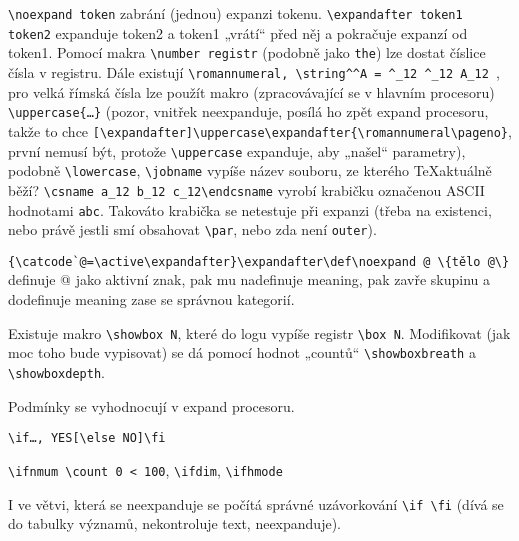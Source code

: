 \documentclass[12pt]{article}					%
\begin{document}
\begin{definice}
        \verb|\noexpand token| zabrání (jednou) expanzi tokenu. \verb|\expandafter token1 token2| expanduje token2 a token1 „vrátí“ před něj a pokračuje expanzí od token1. Pomocí makra \verb|\number registr| (podobně jako \verb|the|) lze dostat číslice čísla v registru. Dále existují \verb|\romannumeral, \string^^A = ^_12 ^_12 A_12 |, pro velká římská čísla lze použít makro (zpracovávající se v hlavním procesoru) \verb|\uppercase{…}| (pozor, vnitřek neexpanduje, posílá ho zpět expand procesoru, takže to chce \verb|[\expandafter]\uppercase\expandafter{\romannumeral\pageno}|, první nemusí být, protože \verb|\uppercase| expanduje, aby „našel“ parametry), podobně \verb|\lowercase|, \verb|\jobname| vypíše název souboru, ze kterého \TeX aktuálně běží? \verb|\csname a_12 b_12 c_12\endcsname| vyrobí krabičku označenou ASCII hodnotami \verb|abc|. Takováto krabička se netestuje při expanzi (třeba na existenci, nebo právě jestli smí obsahovat \verb|\par|, nebo zda není \verb|outer|).
    \end{definice}

    \begin{priklad}
        \verb|{\catcode`@=\active\expandafter}\expandafter\def\noexpand @ \{tělo @\}| definuje @ jako aktivní znak, pak mu nadefinuje meaning, pak zavře skupinu a dodefinuje meaning zase se správnou kategorií.
    \end{priklad}

    \begin{poznamka}[Debug]
        Existuje makro \verb|\showbox N|, které do logu vypíše registr \verb|\box N|. Modifikovat (jak moc toho bude vypisovat) se dá pomocí hodnot „countů“ \verb|\showboxbreath| a \verb|\showboxdepth|.
    \end{poznamka}

    \begin{definice}[Podmínky]
        Podmínky se vyhodnocují v expand procesoru.
        
        \verb|\if…, YES[\else NO]\fi|

        \verb|\ifnmum \count 0 < 100|, \verb|\ifdim|, \verb|\ifhmode|
    \end{definice}


    \begin{poznamka}
        I ve větvi, která se neexpanduje se počítá správné uzávorkování \verb|\if \fi| (dívá se do tabulky významů, nekontroluje text, neexpanduje).
    \end{poznamka}
\end{document}
